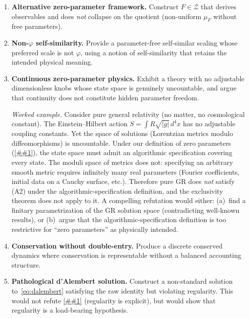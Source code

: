 \documentclass[11pt]{article}
\providecommand{\cref}[1]{\ref{##1}}%
\newcommand{\cZ}{\mathcal{Z}}
\theoremstyle{definition}
\theoremstyle{remark}
\begin{document}
\begin{enumerate}
\item \textbf{Alternative zero-parameter framework.}
  Construct $F \in \cZ$ that derives observables and does
  \emph{not} collapse on the quotient (non-uniform
  $\mu_F$ without free parameters).

\item \textbf{Non-$\varphi$ self-similarity.}
  Provide a parameter-free self-similar scaling whose preferred
  scale is not $\varphi$, using a notion of self-similarity that
  retains the intended physical meaning.

\item \textbf{Continuous zero-parameter physics.}
  Exhibit a theory with no adjustable dimensionless knobs whose
  state space is genuinely uncountable, and argue that
  continuity does not constitute hidden parameter freedom.

  \emph{Worked example.}
  Consider pure general relativity (no matter, no cosmological
  constant).
  The Einstein--Hilbert action $S = \int R \sqrt{|g|}\,d^4x$
  has no adjustable coupling constants.
  Yet the space of solutions (Lorentzian metrics modulo
  diffeomorphisms) is uncountable.
  Under our definition of zero parameters
  (\cref{def:zero-param}), the state space must admit an
  algorithmic specification covering every state.
  The moduli space of metrics does not: specifying an arbitrary
  smooth metric requires infinitely many real parameters
  (Fourier coefficients, initial data on a Cauchy surface, etc.).
  Therefore pure GR does \emph{not} satisfy (A2) under the
  algorithmic-specification definition, and the exclusivity
  theorem does not apply to it.
  A compelling refutation would either:
  (a)~find a finitary parametrization of the GR solution space
  (contradicting well-known results), or
  (b)~argue that the algorithmic-specification definition is too
  restrictive for ``zero parameters'' as physically intended.

\item \textbf{Conservation without double-entry.}
  Produce a discrete conserved dynamics where conservation is
  representable without a balanced accounting structure.

\item \textbf{Pathological d'Alembert solution.}
  Construct a non-standard solution to~\eqref{eq:dalembert}
  satisfying the raw identity but violating regularity.
  This would not refute \cref{thm:t5} (regularity is explicit),
  but would show that regularity is a load-bearing hypothesis.
\end{enumerate}
\end{document}
